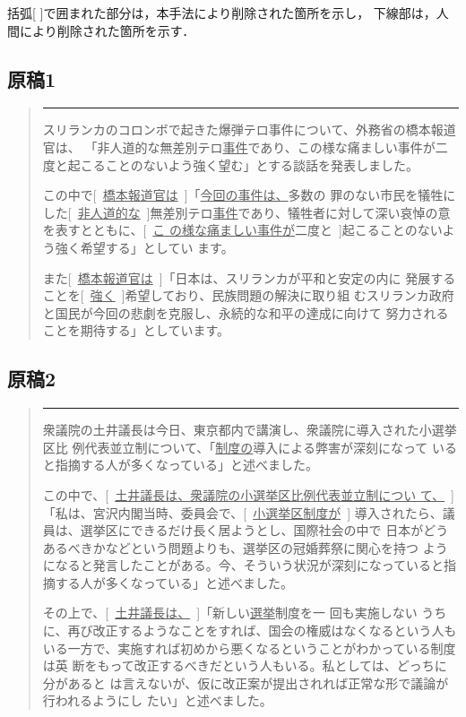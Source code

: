 括弧[ ]で囲まれた部分は，本手法により削除された箇所を示し，
下線部は，人間により削除された箇所を示す．

\subsection*{原稿1}
\begin{quotation}
\hrule

 スリランカのコロンボで起きた爆弾テロ事件について、外務省の橋本報道官は、
 「非人道的な無差別テロ\underline{事件}であり、この様な痛ましい事件が二
 度と起こることのないよう強く望む」とする談話を発表しました。

 この中で[~\underline{橋本報道官は}~]「\underline{今回の事件は、}多数の
 罪のない市民を犠牲にした[~\underline{非人道的な}~]無差別テロ\underline
 {事件}であり、犠牲者に対して深い哀悼の意を表すとともに、[~\underline{こ
 の様な痛ましい事件が}二度と~]起こることのないよう強く希望する」としてい
 ます。

 また[~\underline{橋本報道官は}~]「日本は、スリランカが平和と安定の内に
 発展することを[~\underline{強く}~]希望しており、民族問題の解決に取り組
 むスリランカ政府と国民が今回の悲劇を克服し、永続的な和平の達成に向けて
 努力されることを期待する」としています。
\end{quotation}

\subsection*{原稿2}
\begin{quotation}
\hrule

 衆議院の土井議長は今日、東京都内で講演し、衆議院に導入された小選挙区比
 例代表並立制について、「\underline{制度の}導入による弊害が深刻になって
 いると指摘する人が多くなっている」と述べました。

 この中で、[~\underline{土井議長は、衆議院の小選挙区比例代表並立制につい
 て、}~] 「私は、宮沢内閣当時、委員会で、[~\underline{小選挙区制度が}~]
 導入されたら、議員は、選挙区にできるだけ長く居ようとし、国際社会の中で
 日本がどうあるべきかなどという問題よりも、選挙区の冠婚葬祭に関心を持つ
 ようになると発言したことがある。今、そういう状況が深刻になっていると指
 摘する人が多くなっている」と述べました。

 その上で、[~\underline{土井議長は、}~]「新しい\underline{選挙}制度を一
 回も実施しない
 うちに、再び改正するようなことをすれば、国会の権威はなくなるという人も
 いる一方で、実施すれば初めから悪くなるということがわかっている制度は英
 断をもって改正するべきだという人もいる。私としては、どっちに分があると
 は言えないが、仮に改正案が提出されれば正常な形で議論が行われるようにし
 たい」と述べました。
\end{quotation}

